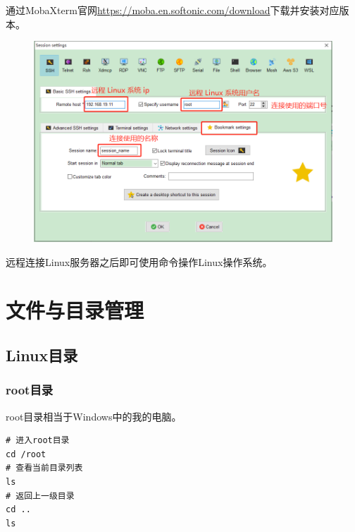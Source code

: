 \documentclass[12pt, openany, oneside]{book}
\begin{document}
通过MobaXterm官网\url{https://moba.en.softonic.com/download}下载并安装对应版本。

\begin{figure}[H]
    \centering
    \includegraphics[scale=0.4]{img/C1/1-5/1.png}
\end{figure}

远程连接Linux服务器之后即可使用命令操作Linux操作系统。\\

\newpage

\chapter{文件与目录管理}

\section{Linux目录}

\subsection{root目录}

root目录相当于Windows中的我的电脑。

\vspace{-0.5cm}

\begin{lstlisting}
# 进入root目录
cd /root
# 查看当前目录列表
ls
# 返回上一级目录
cd ..
ls
\end{lstlisting}
\end{document}
